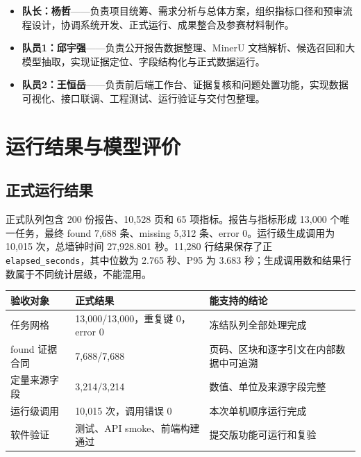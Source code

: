 \documentclass[UTF8,a4paper,11pt]{ctexart}
\begin{document}
\begin{itemize}

\item

\textbf{队长：杨哲}——负责项目统筹、需求分析与总体方案，组织指标口径和预审流程设计，协调系统开发、正式运行、成果整合及参赛材料制作。\par

\item

\textbf{队员1：邱宇强}——负责公开报告数据整理、MinerU 文档解析、候选召回和大模型抽取，实现证据定位、字段结构化与正式数据运行。\par

\item

\textbf{队员2：王恒岳}——负责前后端工作台、证据复核和问题处置功能，实现数据可视化、接口联调、工程测试、运行验证与交付包整理。\par

\end{itemize}

\section{运行结果与模型评价}

\subsection{正式运行结果}

正式队列包含 200 份报告、10,528 页和 65 项指标。报告与指标形成 13,000 个唯一任务，最终 found 7,688 条、missing 5,312 条、error 0。运行级生成调用为 10,015 次，总墙钟时间 27,928.801 秒。11,280 行结果保存了正 \texttt{elapsed\_seconds}，其中位数为 2.765 秒、P95 为 3.683 秒；生成调用数和结果行数属于不同统计层级，不能混用。\par

\begin{center}
\small
\setlength{\tabcolsep}{4pt}
\begin{tabularx}{\textwidth}{@{}YYY@{}}
\toprule
{} \textbf{验收对象} & \textbf{正式结果} & \textbf{能支持的结论} \\
\midrule
任务网格 & 13,000/13,000，重复键 0，error 0 & 冻结队列全部处理完成 \\
\addlinespace[2pt]
found 证据合同 & 7,688/7,688 & 页码、区块和逐字引文在内部数据中可追溯 \\
\addlinespace[2pt]
定量来源字段 & 3,214/3,214 & 数值、单位及来源字段完整 \\
\addlinespace[2pt]
运行级调用 & 10,015 次，调用错误 0 & 本次单机顺序运行完成 \\
\addlinespace[2pt]
软件验证 & 测试、API smoke、前端构建通过 & 提交版功能可运行和复验 \\
\bottomrule
\end{tabularx}
\end{center}
\end{document}
